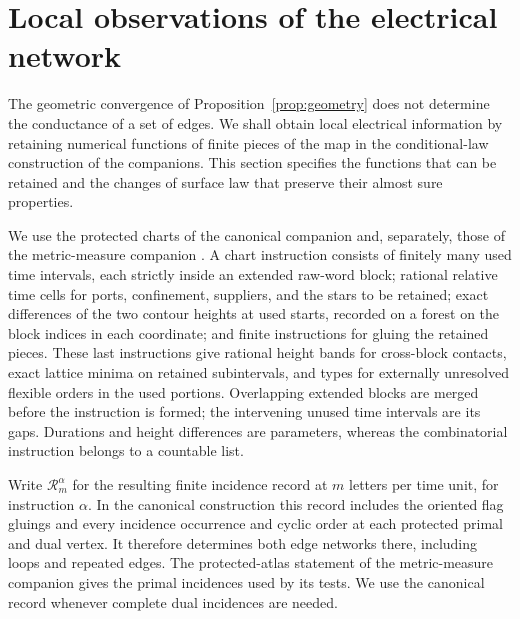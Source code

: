 \section{Local observations of the electrical network}
\label{sec:locality}

The geometric convergence of Proposition~\ref{prop:geometry} does not
determine the conductance of a set of edges.  We shall obtain local
electrical information by retaining numerical functions of finite pieces
of the map in the conditional-law construction of the companions.  This
section specifies the functions that can be retained and the changes of
surface law that preserve their almost sure properties.

We use the protected charts of the canonical companion
\cite[Section~5]{C} and, separately, those of the metric-measure companion
\cite[Sections~5 and~7]{P}.  A chart instruction consists of finitely
many used time intervals, each strictly inside an extended raw-word
block; rational relative time cells for ports, confinement, suppliers,
and the stars to be retained; exact differences of the two contour
heights at used starts, recorded on a forest on the block indices in each
coordinate; and finite instructions for gluing the retained pieces.
These last instructions give rational height bands for cross-block
contacts, exact lattice minima on retained subintervals, and types for
externally unresolved flexible orders in the used portions.  Overlapping
extended blocks are merged before the instruction is formed; the
intervening unused time intervals are its gaps.  Durations and height differences are
parameters, whereas the combinatorial instruction belongs to a countable
list.

Write \(\mathcal R_m^\alpha\) for the resulting finite incidence record
at \(m\) letters per time unit, for instruction \(\alpha\).  In the
canonical construction this record includes the oriented flag gluings
and every incidence occurrence and cyclic order at each protected primal
and dual vertex.  It therefore determines both edge networks there,
including loops and repeated edges.  The protected-atlas statement of the
metric-measure companion gives the primal incidences used by its tests.
We use the canonical record whenever complete dual incidences are needed.

